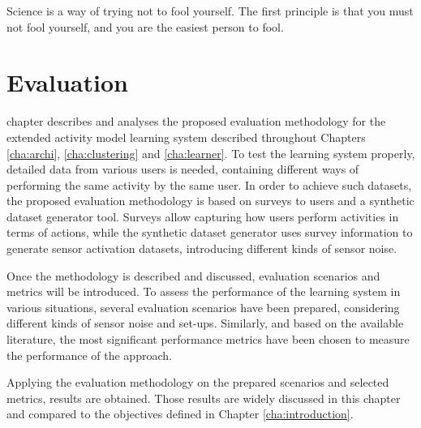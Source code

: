 

\begin{savequote}[50mm]
Science is a way of trying not to fool yourself. The first principle is that you must not fool yourself, and you are the easiest person to fool.
\end{savequote}


\chapter{Evaluation}
\label{cha:evaluation}

\ifpdf
    \graphicspath{{6_evaluation/figures/PDF/}{6_evaluation/figures/PNG/}{6_evaluation/figures/}}
\else
    \graphicspath{{6_evaluation/figures/EPS/}{6_evaluation/figures/}}
\fi

 chapter describes and analyses the proposed evaluation methodology for the extended activity model learning system described throughout Chapters \ref{cha:archi}, \ref{cha:clustering} and \ref{cha:learner}. To test the learning system properly, detailed data from various users is needed, containing different ways of performing the same activity by the same user. In order to achieve such datasets, the proposed evaluation methodology is based on surveys to users and a synthetic dataset generator tool. Surveys allow capturing how users perform activities in terms of actions, while the synthetic dataset generator uses survey information to generate sensor activation datasets, introducing different kinds of sensor noise. 

Once the methodology is described and discussed, evaluation scenarios and metrics will be introduced. To assess the performance of the learning system in various situations, several evaluation scenarios have been prepared, considering different kinds of sensor noise and set-ups. Similarly, and based on the available literature, the most significant performance metrics have been chosen to measure the performance of the approach.

Applying the evaluation methodology on the prepared scenarios and selected metrics, results are obtained. Those results are widely discussed in this chapter and compared to the objectives defined in Chapter \ref{cha:introduction}.

